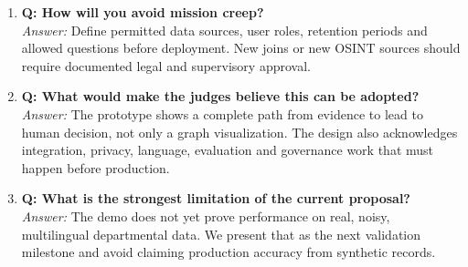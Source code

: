 \documentclass[10pt,a4paper]{article}
\newcommand{\qa}[2]{\item \textbf{\color{navy}Q: #1}\\[-1pt]{\color{coral}\textit{Answer:}} #2}
\begin{document}
\begin{enumerate}[resume]
\qa{How will you avoid mission creep?}{Define permitted data sources, user roles, retention periods and allowed questions before deployment. New joins or new OSINT sources should require documented legal and supervisory approval.}
\qa{What would make the judges believe this can be adopted?}{The prototype shows a complete path from evidence to lead to human decision, not only a graph visualization. The design also acknowledges integration, privacy, language, evaluation and governance work that must happen before production.}
\qa{What is the strongest limitation of the current proposal?}{The demo does not yet prove performance on real, noisy, multilingual departmental data. We present that as the next validation milestone and avoid claiming production accuracy from synthetic records.}
\end{enumerate}
\end{document}
